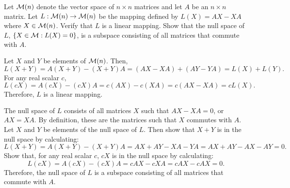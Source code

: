 \documentclass{ximera}
\begin{document}
\begin{exercise} \label{c7.2.4}
Let ${\cal M}(n)$ denote the vector space of $n\times n$
matrices and let $A$ be an $n\times n$ matrix.  Let
$L:{\cal M}(n)\to{\cal M}(n)$ be the mapping defined by
$L(X)=AX-XA$ where $X\in{\cal M}(n)$.  Verify that $L$ is
a linear mapping.  Show that the null space of $L$,
$\{X\in{\cal M}:L(X)=0\}$, is a subspace consisting of all
matrices that commute with $A$.

\begin{solution}

Let $X$ and $Y$ be elements of ${\cal M}(n)$.  Then,
\[ L(X + Y) = A(X + Y) - (X + Y)A = (AX - XA)
+ (AY - YA) = L(X) + L(Y). \]
For any real scalar $c$,
\[ L(cX) = A(cX) - (cX)A = c(AX) - c(XA) = c(AX - XA) = cL(X). \]
Therefore, $L$ is a linear mapping.

\para The null space of $L$ consists of all matrices $X$ such that
$AX - XA = 0$, or $AX = XA$.  By definition, these are the matrices
such that $X$ commutes with $A$.  Let $X$ and $Y$ be elements of
the null space of $L$.  Then show that $X + Y$ is in the null space
by calculating:
\[ L(X + Y) = A(X + Y) - (X + Y)A = AX + AY - XA - YA = AX + AY - AX
- AY = 0. \]
Show that, for any real scalar $c$, $cX$ is in the null space by
calculating:
\[ L(cX) = A(cX) - (cX)A = cAX - cXA = cAX - cAX = 0. \]
Therefore, the null space of $L$ is a subspace consisting of all
matrices that commute with $A$.

\end{solution}
\end{exercise}
\end{document}
